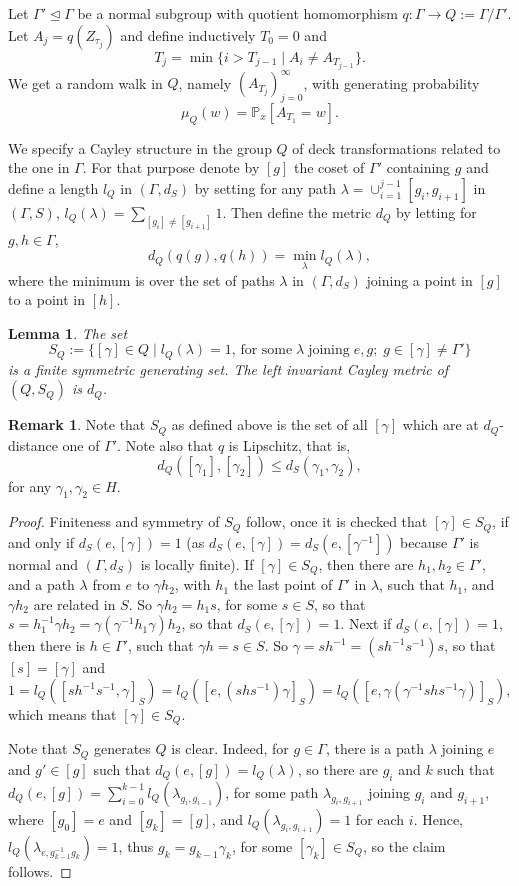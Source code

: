 \documentclass[12pt,a4paper]{amsart}
\numberwithin{equation}{section}
\newtheorem{lem}[equation]{Lemma}
\theoremstyle{definition}
\newtheorem{rem}[equation]{Remark}
\def\p{\mathbb P}
\begin{document}
Let $\Gamma'\trianglelefteq\Gamma$  be a normal subgroup with quotient homomorphism $q:\Gamma\to Q:=\Gamma/\Gamma'$. Let $A_j=q(Z_{\tau_j})$ and define inductively $T_0=0$ and \[T_j=\min\{i>T_{j-1}\mid A_i\neq A_{T_{j-1}}\}.\]
We get a random walk in $Q$, namely $(A_{T_{j}})_{j=0}^{\infty}$, with generating probability $$\mu_Q(w)=\p_x[A_{T_1}=w].$$ 

We specify a Cayley structure in the group $Q$ of deck transformations related to the one in $\Gamma$. For that purpose denote by $[g]$ the coset of $\Gamma'$ containing $g$ and define a length $l_Q$ in $(\Gamma,d_S)$ by setting for any path $\lambda=\cup_{i=1}^{j-1}[g_i,g_{i+1}]$ in $(\Gamma,S)$, $l_Q(\lambda)=\sum_{[g_i]\neq [g_{i+1}]}1$. Then define the metric $d_Q$ by letting for $g,h\in \Gamma$,
\[d_Q(q(g),q(h))=\min_{\lambda}l_{Q}(\lambda),\] where the minimum is over the set of paths $\lambda$ in $(\Gamma,d_S)$ joining a point in $[g]$ to a point in $[h]$.

\begin{lem}\label{proj1}
The set \[S_Q:=\{[\gamma]\in Q\mid l_Q(\lambda)=1,\, \text{for some}\;\lambda\;\text{joining}\;e,g;\; g\in [\gamma]\neq \Gamma'\}\] is a finite symmetric generating set. The left invariant Cayley metric of $(Q,S_Q)$ is $d_Q$.
\end{lem}
\begin{rem}\label{Lip} 
Note that $S_Q$ as defined above is the set of all $[\gamma]$ which are at $d_Q$-distance one of $\Gamma'$. Note also that $q$ is Lipschitz, that is, 
\[d_Q([\gamma_1],[\gamma_2])\leq d_S(\gamma_1,\gamma_2),\]
for any $\gamma_1,\gamma_2\in H$.
\end{rem}
\begin{proof}
Finiteness and symmetry of $S_Q$ follow, once it is checked that $[\gamma]\in S_Q$, if and only if $d_S(e,[\gamma])=1$ (as $d_S(e,[\gamma])=d_S(e,[\gamma^{-1}])$ because $\Gamma'$ is normal and $(\Gamma,d_S)$ is locally finite). If $[\gamma]\in S_Q$, then there are $h_1,h_2\in\Gamma'$, and a path $\lambda$ from $e$ to $\gamma h_2$, with $h_1$ the last point of $\Gamma'$ in $\lambda$, such that $h_1$, and $\gamma h_2$ are related in $S$. So $\gamma h_2=h_1s$, for some $s\in S$, so that $s=h_1^{-1}\gamma h_2=\gamma(\gamma^{-1}h_1\gamma)h_2$, so that $d_S(e,[\gamma])=1$. Next if $d_S(e,[\gamma])=1$, then there is $h\in \Gamma'$, such that $\gamma h=s\in S$. So $\gamma=sh^{-1}=(sh^{-1}s^{-1})s$, so that $[s]=[\gamma]$ and 
\[1=l_Q([sh^{-1}s^{-1},\gamma]_S)=l_Q([e,(shs^{-1})\gamma]_S)=l_Q([e,\gamma(\gamma^{-1}shs^{-1}\gamma)]_S),\] which means that $[\gamma]\in S_Q$.

Note that $S_Q$ generates $Q$ is clear. Indeed, for $g\in \Gamma$, there is a path $\lambda$ joining $e$ and $g'\in [g]$ such that $d_Q(e,[g])=l_Q(\lambda)$, so there are $g_i$ and $k$ such that $d_Q(e,[g])=\sum_{i=0}^{k-1}l_Q(\lambda_{g_i,g_{i-1}})$, for some path $\lambda_{g_{i},g_{i+1}}$ joining $g_i$ and $g_{i+1}$, where $[g_0]=e$ and $[g_k]=[g]$, and $l_Q(\lambda_{g_i,g_{i+1}})=1$ for each $i$. Hence, $l_Q(\lambda_{e,g_{k-1}^{-1}g_k})=1$, thus $g_k=g_{k-1}\gamma_{k}$, for some $[\gamma_k]\in S_Q$, so the claim follows.
\end{proof}
\end{document}
